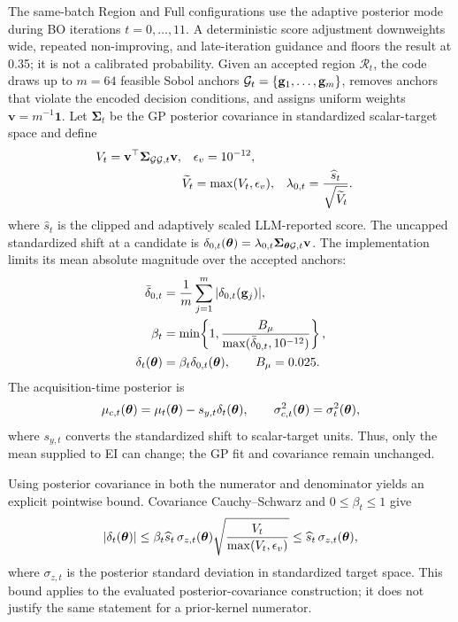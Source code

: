 The same-batch Region and Full configurations use the adaptive posterior mode
during BO iterations $t=0,\ldots,11$. A deterministic score adjustment
downweights wide, repeated non-improving, and late-iteration guidance and
floors the result at 0.35; it is not a calibrated probability. Given an
accepted region $\mathcal R_t$, the code draws up to $m=64$ feasible Sobol
anchors
$\mathcal{G}_t=\{\mathbf g_1,\ldots,\mathbf g_m\}$, removes anchors that violate the
encoded decision conditions, and assigns uniform weights
$\mathbf v=m^{-1}\mathbf 1$. Let
$\boldsymbol\Sigma_t$ be the GP posterior covariance in standardized
scalar-target space and define
\begin{equation}
\begin{aligned}
V_t=\mathbf v^\top\boldsymbol\Sigma_{\mathcal{G}\mathcal{G},t}\mathbf v,\quad
&\epsilon_v=10^{-12},\\
\widetilde V_t&=\max(V_t,\epsilon_v),&
\lambda_{0,t}&=\frac{\widehat s_t}{\sqrt{\widetilde V_t}} .
\end{aligned}
\label{eq:lambda}
\end{equation}
where $\widehat s_t$ is the clipped and adaptively scaled LLM-reported score.
The uncapped standardized shift at a candidate is
$\delta_{0,t}(\boldsymbol{\theta})=
\lambda_{0,t}\boldsymbol\Sigma_{\boldsymbol{\theta}\mathcal{G},t}\mathbf v$.
The implementation limits its mean absolute magnitude over the accepted
anchors:
\begin{equation}
\begin{aligned}
\bar\delta_{0,t}
&=\frac{1}{m}\sum_{j=1}^{m}|\delta_{0,t}(\mathbf g_j)|,\\
\beta_t&=\min\!\left\{1,
\frac{B_\mu}{\max(\bar\delta_{0,t},10^{-12})}\right\},\\
\delta_t(\boldsymbol{\theta})&=\beta_t\delta_{0,t}(\boldsymbol{\theta}),\qquad B_\mu=0.025 .
\end{aligned}
\label{eq:shift_budget}
\end{equation}
The acquisition-time posterior is
\begin{equation}
\mu_{c,t}(\boldsymbol{\theta})=\mu_t(\boldsymbol{\theta})-s_{y,t}\delta_t(\boldsymbol{\theta}),
\qquad
\sigma_{c,t}^2(\boldsymbol{\theta})=\sigma_t^2(\boldsymbol{\theta}),
\label{eq:coupled_mean}
\end{equation}
where $s_{y,t}$ converts the standardized shift to scalar-target units. Thus,
only the mean supplied to EI can change; the GP fit and covariance remain
unchanged.

Using posterior covariance in both the numerator and denominator yields an
explicit pointwise bound. Covariance Cauchy--Schwarz and
$0\leq\beta_t\leq1$ give
\begin{equation}
|\delta_t(\boldsymbol{\theta})|
\leq
\beta_t\widehat s_t\,\sigma_{z,t}(\boldsymbol{\theta})
\sqrt{\frac{V_t}{\max(V_t,\epsilon_v)}}
\leq \widehat s_t\,\sigma_{z,t}(\boldsymbol{\theta}),
\label{eq:lift_bound}
\end{equation}
where $\sigma_{z,t}$ is the posterior standard deviation in standardized
target space. This bound applies to the evaluated posterior-covariance
construction; it does not justify the same statement for a prior-kernel
numerator.

